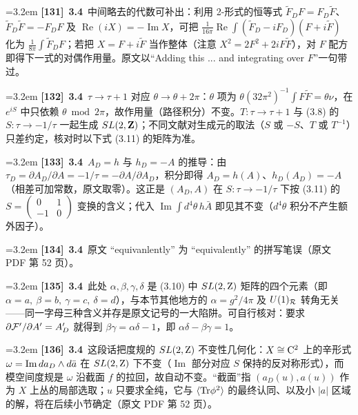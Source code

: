 \par
\par\medskip\noindent\hangindent=3.2em \textbf{[131]}~\textbf{3.4}~中间略去的代数可补出：利用 2-形式的恒等式 $\widetilde F_D F=F_D\widetilde F$、$\widetilde F_D\widetilde F=-F_D F$ 及 $\operatorname{Re}(iX)=-\operatorname{Im}X$，可把 $\frac1{16\pi}\operatorname{Re}\int(\widetilde F_D-iF_D)(F+i\widetilde F)$ 化为 $\frac1{8\pi}\int\widetilde F_D F$；若把 $X=F+i\widetilde F$ 当作整体（注意 $X^2=2F^2+2iF\widetilde F$），对 $F$ 配方即得下一式的对偶作用量。原文以“Adding this ... and integrating over $F$”一句带过。
\par
\par\medskip\noindent\hangindent=3.2em \textbf{[132]}~\textbf{3.4}~$\tau\to\tau+1$ 对应 $\theta\to\theta+2\pi$：$\theta$ 项为 $\theta(32\pi^2)^{-1}\int F\widetilde F=\theta\nu$，在 $e^{iS}$ 中只依赖 $\theta\bmod 2\pi$，故作用量（路径积分）不变。$T:\tau\to\tau+1$ 与 (3.8) 的 $S:\tau\to-1/\tau$ 一起生成 $SL(2,{\bf Z})$；不同文献对生成元的取法（$S$ 或 $-S$、$T$ 或 $T^{-1}$）只差约定，核对时以下式 (3.11) 的矩阵为准。
\par
\par\medskip\noindent\hangindent=3.2em \textbf{[133]}~\textbf{3.4}~$A_D=h$ 与 $h_D=-A$ 的推导：由 $\tau_D=\partial A_D/\partial A=-1/\tau=-\partial A/\partial A_D$，积分即得 $A_D=h(A)$、$h_D(A_D)=-A$（相差可加常数，原文取零）。这正是 $(A_D,A)$ 在 $S:\tau\to-1/\tau$ 下按 (3.11) 的 $S=\begin{pmatrix}0&1\\-1&0\end{pmatrix}$ 变换的含义；代入 $\operatorname{Im}\int d^4\theta\,h\bar A$ 即见其不变（$d^4\theta$ 积分不产生额外因子）。
\par
\par\medskip\noindent\hangindent=3.2em \textbf{[134]}~\textbf{3.4}~原文 “equivanlently” 为 “equivalently” 的拼写笔误（原文 PDF 第 52 页）。
\par
\par\medskip\noindent\hangindent=3.2em \textbf{[135]}~\textbf{3.4}~此处 $\alpha,\beta,\gamma,\delta$ 是 (3.10) 中 $SL(2,{\rm Z})$ 矩阵的四个元素（即 $\alpha=a,\ \beta=b,\ \gamma=c,\ \delta=d$），与本节其他地方的 $\alpha=g^2/4\pi$ 及 $U(1)_{\cal R}$ 转角无关——同一字母三种含义并存是原文记号的一大陷阱。可自行核对：要求 $\partial{\cal F}'/\partial A'=A'_D$ 就得到 $\beta\gamma=\alpha\delta-1$，即 $\alpha\delta-\beta\gamma=1$。
\par
\par\medskip\noindent\hangindent=3.2em \textbf{[136]}~\textbf{3.4}~这段话把度规的 $SL(2,{\rm Z})$ 不变性几何化：$X\cong{\rm C}^2$ 上的辛形式 $\omega={\rm Im}\,da_D\wedge d\bar a$ 在 $SL(2,{\rm Z})$ 下不变（$\operatorname{Im}$ 部分对应 $S$ 保持的反对称形式），而模空间度规是 $\omega$ 沿截面 $f$ 的拉回，故自动不变。“截面”指 $(a_D(u),a(u))$ 作为 $X$ 上丛的局部选取；$u$ 只要求全纯，它与 $\langle{\rm Tr}\phi^2\rangle$ 的最终认同、以及小 $|a|$ 区域的解，将在后续小节确定（原文 PDF 第 52 页）。
